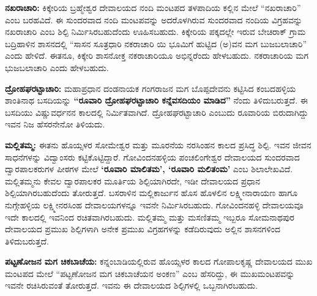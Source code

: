 \textbf{ನಖರಾಚಾರಿ:} ಕಿಕ್ಕೇರಿಯ ಬ್ರಹ್ಮೇಶ್ವರ ದೇವಾಲಯದ ನಂದಿ ಮಂಟಪದ ತಳಪಾದಿಯ ಕಲ್ಲಿನ ಮೇಲೆ “ನಖರಾಚಾರಿ” ಎಂಬ ಬರಹವಿದೆ. ಈ ಸುಂದರವಾದ ನಂದಿ ಮಂಟಪವನ್ನು ಅದರೊಳಗಿರುವ ಸುಂದರವಾದ ನಂದಿಯ ವಿಗ್ರಹವನ್ನು ನಖರಾಚಾರಿ ಎಂಬ ಶಿಲ್ಪಿ ನಿರ್ಮಿಸಿರಬಹುದೆಂದು ಊಹಿಸಬಹುದು. ಕಿಕ್ಕೇರಿಯ ಪಕ್ಕದಲ್ಲೇ ಇರುವ ಬೇಚಿರಾಕ್​ ಗ್ರಾಮ ಬದ್ರಿಹಾಳಿನ ಶಾಸನದಲ್ಲಿ “ಸಾಸನ ಸೂತ್ರಧಾರಿ ನಕರಾಚಾರಿ ಯಿ ಭೂಮಿಗೆ ಹುಟ್ಟಿದ (ಅ)ವನ ಮಗ ಬುಜಬಲಾಚಾರಿ” ಎಂದು ಹೇಳಿದೆ. ಈತನೂ, ಕಿಕ್ಕೇರಿ ಶಾಸನೋಕ್ತ ನಕರಾಚಾರಿಯೂ ಅಭಿನ್ನರೆಂದು ಹೇಳಬಹುದು. ನಕರಾಚಾರಿಯ ಮಗ ಭುಜಬಲಾಚಾರಿ ಎಂದು ಹೇಳಬಹುದು.

\textbf{ದ್ರೋಹಘರಟ್ಟಾಚಾರಿ:} ಮಹಾಪ್ರಧಾನ ದಂಡನಾಯಕ ಗಂಗರಾಜನ ಮಗ ಬೊಪ್ಪದೇವನು ಕಟ್ಟಿಸಿದ ಕಂಬದಹಳ್ಳಿಯ ಶಾಂತಿನಾಥ ಬಸದಿಯನ್ನು \textbf{“ರೂವಾರಿ ದ್ರೋಹಘರಟ್ಟಾಚಾರಿ ಕನ್ನೆವಸದಿಯಂ ಮಾಡಿದ” }ನೆಂದು ತಿಳಿದುಬರುತ್ತದೆ. ಈ ಬಸದಿಯು ವಿಷ್ಣುವರ್ಧನನ ಕಾಲದಲ್ಲಿ ನಿರ್ಮಿತವಾಗಿದೆ. ದ್ರೋಹಘರಟ್ಟಾಚಾರಿ ಎಂಬುದು ರೂವಾರಿಯ ಬಿರುದಾಗಿದ್ದು ಇವನ ನಿಜ ಹೆಸರನೇನೋ ತಿಳಿಯದು.

\textbf{ಮಲ್ಲಿತಮ್ಮ:} ಈತನು ಹೊಯ್ಸಳರ ಸೋಮೇಶ್ವರ ಮತ್ತು ಮೂರನೆಯ ನರಸಿಂಹನ ಕಾಲದ ಪ್ರಸಿದ್ಧ ಶಿಲ್ಪಿ. ಇವನ ಜೀವನ ಸಾಧನೆಗಳನ್ನು ವಿದ್ವಾಂಸರು ಕಟ್ಟಿಕೊಟ್ಟಿದ್ದಾರೆ. ಗೋವಿಂದನಹಳ್ಳಿಯ ಪಂಚಲಿಂಗೇಶ್ವರ ದೇವಾಲಯದ ಸುಂದರವಾದ ದ್ವಾರಪಾಲಕರುಗಳ ಪೀಠಗಳ ಮೇಲೆ \textbf{‘ರೂವಾರಿ ಮಾಲಿತಮ’, ‘ರೂವಾರಿ ಮಲಿತಂಮ’} ಎಂಬ ಶಿಲಾಲೇಖವಿದೆ. ಮಲ್ಲಿತಮ್ಮನು ಕೇವಲ ದ್ವಾರಪಾಲಕರ ಮೂರ್ತಿಯ ಶಿಲ್ಪಿಯಾಗಿರದೇ, ಇಡೀ ದೇವಾಲಯದ ಪ್ರಧಾನ ಶಿಲ್ಪಿಯಾಗಿರಬಹುದೆಂದು ತೋರುತ್ತದೆ. ಬಸರಾಳಿನ ಮಲ್ಲಿಕಾರ್ಜುನ ಹೊಸ ಹೊಳಲಿನ ಲಕ್ಷ್ಮೀನಾರಾಯಣ ಹಾಗೂ ನುಗ್ಗೇಹಳ್ಳಿಯ ಲಕ್ಷ್ಮೀನರಸಿಂಹ ದೇವಾಲಯಗಳನ್ನೂ ಇವನೇ ನಿರ್ಮಿಸಿರಬಹುದು. ಗೋವಿಂದನಹಳ್ಳಿ ದೇವಾಲಯವೂ ಇದೇ ಕಾಲದಲ್ಲಿ ಇವನಿಂದ ರಚಿತವಾಗಿರಬಹುದು. ಮಲ್ಲಿತಮ್ಮ ಮತ್ತು ಮಸಣಿತಮ್ಮ ಇಬ್ಬರೂ ಸೋಮನಾಥಪುರ ದೇವಾಲಯದ ಪ್ರಮುಖ ಶಿಲ್ಪಿಗಳಾಗಿ ಅನೇಕ ಪ್ರಮುಖ ವಿಗ್ರಹಗಳನ್ನು ಕಡೆದಿರುವುದು ಅಲ್ಲಿನ ಶಾಸನಗಳಿಂದ ತಿಳಿದುಬರುತ್ತದೆ.

\textbf{ಪಟ್ಟಣೋಜನ ಮಗ ಚಿಕಬಾಚೆಯ:} ಕನ್ನಂಬಾಡಿಯಲ್ಲಿರುವ ಹೊಯ್ಸಳರ ಕಾಲದ ಗೋಪಾಲಕೃಷ್ಣ ದೇವಾಲಯದ ಮುಖ ಮಂಟಪದ ಮೇಲೆ “ಪಟ್ಟಣೋಜನ ಮಗ ಚಿಕಬಾಚೆಯನ ಅಂಕಣ” ಎಂಬ ಹೆಸರಿದ್ದು, ಈ ಮುಖಮಂಟಪವನ್ನು ಇವನೇ ರಚಿಸಿರುವಂತೆ ತೋರುತ್ತದೆ. ಇವನು ಈ ದೇವಾಲಯದ ಶಿಲ್ಪಿಗಳಲ್ಲಿ ಒಬ್ಬನಾಗಿರಬಹುದು.

